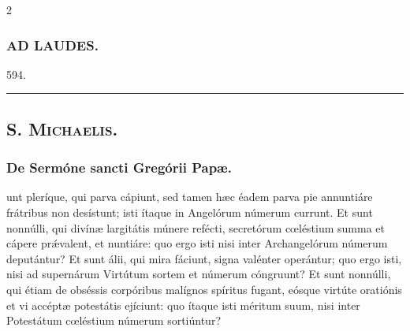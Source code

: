 \documentclass[9pt,twoside]{extarticle}
\begin{document}
\begin{multicols}{2}
\subsubsection*{\center \textsc{AD LAUDES.}}
\begin{tightlist}{}
\item {}
\item {} 594.
\item {}
\end{tightlist}

\begin{center}\textcolor{red}{\rule{\linewidth}{0.5pt}} \end{center}

\subsection*{\center \textsc{}}
\subsubsection*{\center {}}
\subsection*{\center \textsc{S. Michaelis.}}
\subsubsection*{\center {}}

\subsubsection*{\center De Sermóne sancti Gregórii Papæ.}
\begin{center}\end{center}
unt pleríque, qui parva cápiunt, sed tamen hæc éadem parva pie annuntiáre frátribus non desístunt; isti ítaque in Angelórum númerum currunt. Et sunt nonnúlli, qui divínæ largitátis múnere refécti, secretórum cœléstium summa et cápere prǽvalent, et nuntiáre: quo ergo isti nisi inter Archangelórum númerum deputántur? Et sunt álii, qui mira fáciunt, signa valénter operántur; quo ergo isti, nisi ad supernárum Virtútum sortem et númerum cóngruunt? Et sunt nonnúlli, qui étiam de obséssis corpóribus malígnos spíritus fugant, eósque virtúte oratiónis et vi accéptæ potestátis ejíciunt: quo ítaque isti méritum suum, nisi inter Potestátum cœléstium númerum sortiúntur?


\end{multicols}
\end{document}
